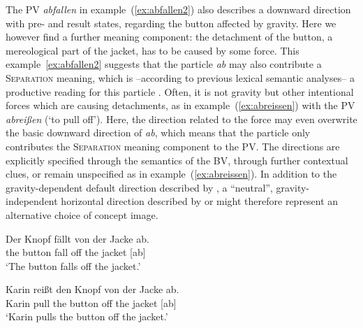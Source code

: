 \documentclass[output=paper]{langsci/langscibook}
\begin{document}
The PV \textit{abfallen} in example~(\ref{ex:abfallen2}) also
describes a downward direction with pre- and result states, regarding
the button affected by gravity. Here we however find a further meaning
component: the detachment of the button, a mereological part of the
jacket, has to be caused by some force. This
example~\ref{ex:abfallen2} suggests that the particle \textit{ab} may
also contribute a \textsc{Separation} meaning, which is --according to
previous lexical semantic analyses-- a productive reading for this
particle \citep{Kliche:11}. Often, it is not gravity but other
intentional forces which are causing detachments, as in
example~(\ref{ex:abreissen}) with the PV \textit{abreißen} (`to pull
off'). Here, the direction related to the force may even overwrite the
basic downward direction of \textit{ab}, which means that the particle
only contributes the \textsc{Separation} meaning component to the
PV. The directions are explicitly specified through the semantics of
the BV, through further contextual clues, or remain unspecified as in
example~(\ref{ex:abreissen}). In addition to the gravity-dependent
default direction described by , a ``neutral'',
gravity-independent horizontal direction described by
 or  might therefore represent an
alternative choice of concept image.

\ea\label{ex:abfallen2}
\gll Der Knopf fällt von der Jacke ab.\\
the button fall off the jacket [ab]\\
\glt `The button falls off the jacket.'  
\z

\ea\label{ex:abreissen}
\gll Karin reißt den Knopf von der Jacke ab.\\
Karin pull the button off the jacket [ab]\\
\glt `Karin pulls the button off the jacket.'
\z
\end{document}

